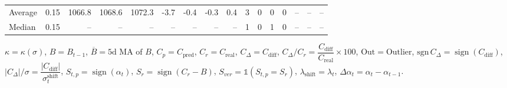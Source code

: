 \begin{threeparttable}
{\begin{tabular}{lrrrrrrrrrrrrrrr}
Average &     0.15 & 1066.8 & 1068.6 & 1072.3 &       -3.7 &           -0.4 &                     -0.3 &                 0.4 &              3 &         0 &     0 &         0 &         -- &        -- &             -- \\
 Median &     0.15 &     -- &     -- &     -- &         -- &             -- &                       -- &                  -- &              1 &         0 &     1 &         0 &         -- &        -- &             -- \\
\bottomrule
\end{tabular}
}
\begin{tablenotes}\footnotesize
\item $\kappa=\kappa(\sigma)$, $B=B_{t-1}$, $\overline{B}=\text{5d MA of }B$, $C_p=C_{\text{pred}}$, $C_r=C_{\text{real}}$, $C_\Delta=C_{\text{diff}}$, $C_\Delta/C_r=\dfrac{C_{\text{diff}}}{C_{\text{real}}}\times100$, $\mathrm{Out}=\text{Outlier}$, $\mathrm{sgn}\,C_\Delta=\operatorname{sign}(C_{\text{diff}})$, $|C_\Delta|/\sigma=\dfrac{|C_{\text{diff}}|}{\sigma_t^{\text{shift}}}$, $S_{t,p}=\operatorname{sign}(\alpha_t)$, $S_r=\operatorname{sign}(C_r - B)$, $S_{ver}=\mathbb{1}(S_{t,p}=S_r)$, $\lambda_{\text{shift}}=\lambda_t$, $\Delta\alpha_t=\alpha_t-\alpha_{t-1}$.\end{tablenotes}
\end{threeparttable}
\endgroup

